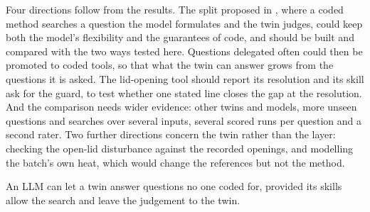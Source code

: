   Four directions follow from the results. The split proposed in , where a
  coded method searches a question the model formulates and the twin judges, could keep both the
  model's flexibility and the guarantees of code, and should be built and compared with the two
  ways tested here. Questions delegated often could then be promoted to coded tools, so that what
  the twin can answer grows from the questions it is asked. The lid-opening tool should report its
  resolution and its skill ask for the guard, to test whether one stated line closes the gap at
  the resolution. And the comparison needs wider evidence: other twins and models, more unseen
  questions and searches over several inputs, several scored runs per question and a second rater.
  Two further directions concern the twin rather than the layer: checking the open-lid disturbance
  against the recorded openings, and modelling the batch's own heat, which would change the
  references but not the method.

  An LLM can let a twin answer questions no one coded for, provided its skills allow the
  search and leave the judgement to the twin.
